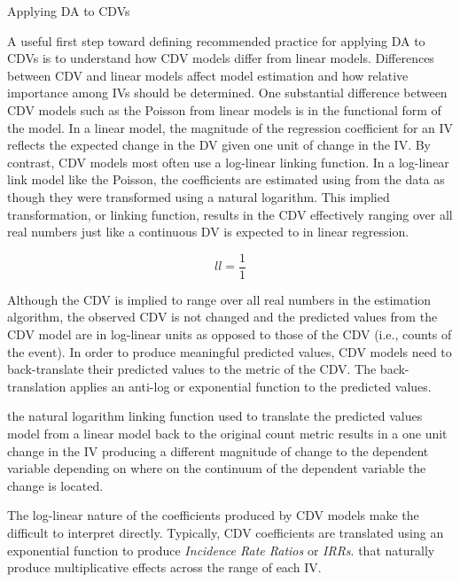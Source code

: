 \documentclass[ShortAfour,times,sageapa]{sagej}
\begin{document}
	
	

	Applying DA to CDVs


	A useful first step toward defining recommended practice for applying DA to CDVs is to understand how CDV models differ from linear models.
	Differences between CDV and linear models affect model estimation and how relative importance among IVs should be determined.	
	One substantial difference between CDV models such as the Poisson from linear models is in the functional form of the model. 
	In a linear model, the magnitude of the regression coefficient for an IV reflects the expected change in the DV given one unit of change in the IV. 
	By contrast, CDV models most often use a log-linear linking function.
  	In a log-linear link model like the Poisson, the coefficients are estimated using from the data as though they were transformed using a natural logarithm.  This implied transformation, or linking function, results in the CDV effectively ranging over all real numbers just like a continuous DV is expected to in linear regression.
  	
  	\begin{equation}
  		ll = \frac{1}{1}
  	\end{equation}
  	
  	Although the CDV is implied to range over all real numbers in the estimation algorithm, the observed CDV is not changed and the predicted values from the CDV model are in log-linear units as opposed to those of the CDV (i.e., counts of the event).  	
  	In order to produce meaningful predicted values, CDV models need to back-translate their predicted values to the metric of the CDV.  The back-translation applies an anti-log or exponential function to the predicted values.
  	 
  	the natural logarithm linking function used to translate the predicted values
  	model from a linear model back to the original count metric results in a one unit change in the IV producing a different magnitude of change to the dependent variable depending on where on the continuum of the dependent variable the change is located. 

	The log-linear nature of the coefficients produced by CDV models make the difficult to interpret directly. 
	Typically, CDV coefficients are translated using an exponential function to produce \emph{Incidence Rate Ratios} or \emph{IRRs}.  
	that naturally produce multiplicative effects across the range of each IV.
\end{document}
